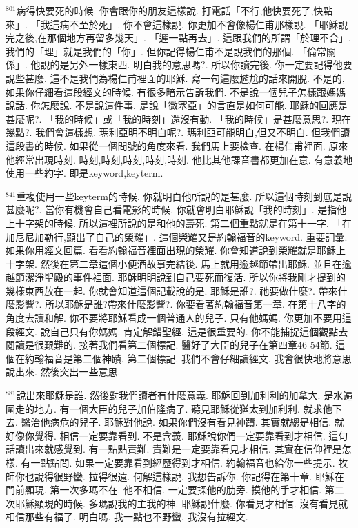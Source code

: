 \documentclass{book}
\begin{document}
$^{801}$病得快要死的時候.
你會跟你的朋友這樣說.
打電話「不行,他快要死了,快點來」.
「我這病不至於死」.
你不會這樣說.
你更加不會像楊仁甫那樣說.
「耶穌說完之後,在那個地方再留多幾天」.
「遲一點再去」.
這跟我們的所謂「於理不合」.
我們的「理」就是我們的「你」.
但你記得楊仁甫不是說我們的那個.
「倫常關係」.
他說的是另外一樣東西.
明白我的意思嗎?.
所以你讀完後.
你一定要記得他要說些甚麼.
這不是我們為楊仁甫裡面的耶穌.
寫一句這麼尷尬的話來開脫.
不是的,如果你仔細看這段經文的時候.
有很多暗示告訴我們.
不是說一個兒子怎樣跟媽媽說話.
你怎麼說.
不是說這件事.
是說「微塞亞」的言直是如何可能.
耶穌的回應是甚麼呢?.
「我的時候」或「我的時刻」還沒有動.
「我的時候」是甚麼意思?.
現在幾點?.
我們會這樣想.
瑪利亞明不明白呢?.
瑪利亞可能明白,但又不明白.
但我們讀這段書的時候.
如果從一個問號的角度來看.
我們馬上要檢查.
在楊仁甫裡面.
原來他經常出現時刻.
時刻,時刻,時刻,時刻,時刻.
他比其他課音書都更加在意.
有意義地使用一些約字.
即是keyword,keyterm.

$^{841}$重複使用一些keyterm的時候.
你就明白他所說的是甚麼.
所以這個時刻到底是說甚麼呢?.
當你有機會自己看電影的時候.
你就會明白耶穌說「我的時刻」.
是指他上十字架的時候.
所以這裡所說的是和他的壽死.
第二個重點就是在第十一字.
「在加尼尼加勒行,顯出了自己的榮耀」.
這個榮耀又是約翰福音的keyword.
重要詞彙.
如果你用經文回篇.
看看約翰福音裡面出現的榮耀.
你會知道說到榮耀就是耶穌上十字架.
然後在第二章這個小便酒故事完結後.
馬上就用逾越節帶出耶穌.
並且在逾越節潔淨聖殿的事件裡面.
耶穌明明說到自己要死而復活.
所以你將我剛才提到的幾樣東西放在一起.
你就會知道這個記載說的是.
耶穌是誰?.
祂要做什麼?.
帶來什麼影響?.
所以耶穌是誰?帶來什麼影響?.
你要看著約翰福音第一章.
在第十八字的角度去讀和解.
你不要將耶穌看成一個普通人的兒子.
只有他媽媽.
你更加不要用這段經文.
說自己只有你媽媽.
肯定解錯聖經.
這是很重要的.
你不能捕捉這個觀點去閱讀是很艱難的.
接著我們看第二個標記.
醫好了大臣的兒子在第四章46-54節.
這個在約翰福音是第二個神蹟.
第二個標記.
我們不會仔細讀經文.
我會很快地將意思說出來.
然後突出一些意思.

$^{881}$說出來耶穌是誰.
然後對我們讀者有什麼意義.
耶穌回到加利利的加拿大.
是水遍圍走的地方.
有一個大臣的兒子加伯隆病了.
聽見耶穌從猶太到加利利.
就求他下去.
醫治他病危的兒子.
耶穌對他說.
如果你們沒有看見神蹟.
其實就總是相信.
就好像你覺得.
相信一定要靠看到.
不是含義.
耶穌說你們一定要靠看到才相信.
這句話讀出來就感覺到.
有一點點責難.
責難是一定要靠看見才相信.
其實在信仰裡是怎樣.
有一點點問.
如果一定要靠看到經歷得到才相信.
約翰福音也給你一些提示.
牧師你也說得很野蠻.
拉得很遠.
何解這樣說.
我想告訴你.
你記得在第十章.
耶穌在門前顯現.
第一次多瑪不在.
他不相信.
一定要探他的肋旁.
摸他的手才相信.
第二次耶穌顯現的時候.
多瑪說我的主我的神.
耶穌說什麼.
你看見才相信.
沒有看見就相信那些有福了.
明白嗎.
我一點也不野蠻.
我沒有拉經文.
\end{document}
